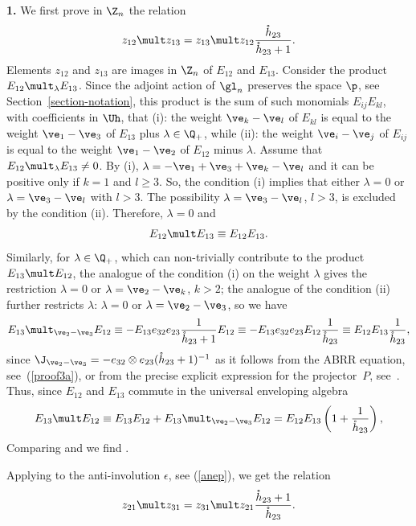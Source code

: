 \documentclass[pdftex]{sigma}
\def\nplus{\mathfrak{n}}\def\nn{\nonumber}\def\nin{\noindent}
\def\s{z}\def\S{\mathrm {S}}\def\si{\sigma}\def\Sp{\S^{\nplus}}\def\sy{\acute{\sigma}}\def\th{\mathring{h}}
\numberwithin{equation}{section}
\begin{document}
{\bf 1.} We f\/irst prove in $\Z_n$ the relation
\begin{gather}\label{proof7}
\s_{12}\mult\s_{13}=\s_{13}\mult\s_{12}  \frac{\th_{23}}{\th_{23}+1}  .
\end{gather}
Elements $\s_{12}$ and $\s_{13}$ are images in $\Z_n$ of $E_{12}$ and $E_{13}$. Consider the
product $E_{12}\mult_\lambda E_{13}$. Since the adjoint action of $\gl_n$ preserves the space
$\p$, see Section~\ref{section-notation}, this product is the sum of such monomials $E_{ij}E_{kl}$,
with coef\/f\/icients in $\Uh$, that (i): the weight $\ve_k-\ve_l$
of $E_{kl}$ is equal to the weight $\ve_{1}-\ve_3$ of $E_{13}$ plus $\lambda\in\Q_+$, while (ii): the
weight $\ve_i-\ve_j$ of $E_{ij}$ is equal to the weight $\ve_{1}-\ve_2$ of $E_{12}$ minus
$\lambda$. Assume that $E_{12}\mult_\lambda E_{13}\neq 0$. By (i), $\lambda =-\ve_1+\ve_3+\ve_k-\ve_l$
and it can be positive only if $k=1$ and $l\geq 3$. So, the condition (i) implies that either
$\lambda=0$ or $\lambda=\ve_3-\ve_l$ with $l>3$. The possibility $\lambda=\ve_3-\ve_l$, $l>3$, is excluded
by the condition (ii). Therefore, $\lambda=0$ and
\begin{gather}
\label{proof8}
E_{12}\mult E_{13}\equiv E_{12}E_{13} .
\end{gather}
Similarly, for $\lambda\in\Q_+$, which can non-trivially contribute to the product $E_{13}\mult E_{12}$,
the analogue of the condition (i) on the weight $\lambda$ gives the
restriction $\lambda =0$ or $\lambda=\ve_2-\ve_k$, $k>2$; the analogue of the condition (ii)
further restricts $\lambda$:  $\lambda=0$ or $\lambda=\ve_2-\ve_3$, so we have
\begin{gather*}
E_{13}\mult_{\ve_2-\ve_3} E_{12}\equiv -E_{13}e_{32}e_{23}  \frac{1}{\th_{23}+1}E_{12}\equiv
-E_{13}e_{32}e_{23}E_{12}  \frac{1}{\th_{23}}\equiv E_{12}E_{13}  \frac{1}{\th_{23}}  ,
\end{gather*}
since $\J_{\ve_2-\ve_3}=-e_{32}\otimes e_{23}(\th_{23}+1)^{-1}$ as it follows from the ABRR
equation, see~(\ref{proof3a}), or from the precise explicit expression for the projector~$P$,
see~\cite{AST}. Thus, since $E_{12}$ and $E_{13}$ commute in the universal enveloping algebra
\begin{gather}\label{proof9}E_{13}\mult E_{12}\equiv E_{13}E_{12}+E_{13}\mult_{\ve_2-\ve_3} E_{12}=
E_{12}E_{13}\left(1+\frac{1}{\th_{23}}\right),
\end{gather}
Comparing  and  we f\/ind .


Applying to  the anti-involution $\epsilon$, see (\ref{anep}), we get the relation
\begin{gather}\label{proof10}
\s_{21}\mult\s_{31}=\s_{31}\mult\s_{21}  \frac{\th_{23}+1}{\th_{23}}  .
\end{gather}
\end{document}
